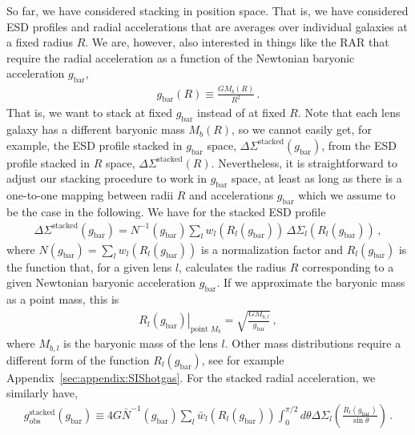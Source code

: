 \documentclass[a4paper,11pt]{article}
\begin{document}
So far, we have considered stacking in position space.
That is, we have considered ESD profiles and radial accelerations that are averages over individual galaxies at a fixed radius $R$.
We are, however, also interested in things like the RAR that require the radial acceleration as a function of the Newtonian baryonic acceleration $g_{\mathrm{bar}}$,
\begin{align}
 g_{\mathrm{bar}}(R) \equiv \frac{G M_b(R)}{R^2} \,.
\end{align}
That is, we want to stack at fixed $g_{\mathrm{bar}}$ instead of at fixed $R$.
Note that each lens galaxy has a different baryonic mass $M_b(R)$, so we cannot easily get, for example, the ESD profile stacked in $g_{\mathrm{bar}}$ space, $\Delta \Sigma^{\mathrm{stacked}}(g_{\mathrm{bar}})$, from the ESD profile stacked in $R$ space, $\Delta \Sigma^{\mathrm{stacked}}(R)$.
Nevertheless, it is straightforward to adjust our stacking procedure to work in $g_{\mathrm{bar}}$ space, at least as long as there is a one-to-one mapping between radii $R$ and accelerations $g_{\mathrm{bar}}$ which we assume to be the case in the following.
We have for the stacked ESD profile
\begin{align}
 \label{eq:Rlofgbar}
 \Delta \Sigma^{\mathrm{stacked}}(g_{\mathrm{bar}}) = N^{-1}(g_{\mathrm{bar}}) \sum_l w_l(R_l(g_{\mathrm{bar}})) \, \Delta \Sigma_l(R_l(g_{\mathrm{bar}})) \,,
\end{align}
where $N(g_{\mathrm{bar}}) = \sum_l w_l(R_l(g_{\mathrm{bar}}))$ is a normalization factor and $R_l(g_{\mathrm{bar}})$ is the function that, for a given lens $l$, calculates the radius $R$ corresponding to a given Newtonian baryonic acceleration $g_{\mathrm{bar}}$.
If we approximate the baryonic mass as a point mass, this is
\begin{align}
 \label{eq:Rlofgbar_point}
 \left. R_l(g_{\mathrm{bar}}) \right|_{\mathrm{point}\;M_b} = \sqrt{\frac{G M_{b,l}}{g_{\mathrm{bar}}}} \,,
\end{align}
where $M_{b,l}$ is the baryonic mass of the lens $l$.
Other mass distributions require a different form of the function $R_l(g_{\mathrm{bar}})$, see for example Appendix~\ref{sec:appendix:SIShotgas}.
For the stacked radial acceleration, we similarly have,
\begin{align}
 \label{eq:gobs_stacked_ab}
 g_{\mathrm{obs}}^{\mathrm{stacked}}(g_{\mathrm{bar}}) \equiv 4G \bar{N}^{-1}(g_{\mathrm{bar}}) \sum_l \bar{w}_l(R_l(g_{\mathrm{bar}})) \int_0^{\pi/2} d \theta \Delta \Sigma_l \left(\frac{R_l(g_{\mathrm{bar}})}{\sin \theta}\right)\,.
\end{align}
\end{document}
